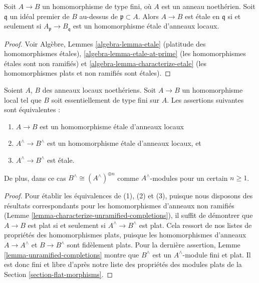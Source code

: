 \begin{lemma}
\label{lemma-characterize-etale-Noetherian}
Soit $A \to B$ un homomorphisme de type fini, où $A$ est un anneau noethérien.
Soit $\mathfrak q$ un idéal premier de $B$ au-dessus de $\mathfrak p \subset A$.
Alors $A \to B$ est \'etale en $\mathfrak q$ si et seulement si
$A_{\mathfrak p} \to B_{\mathfrak q}$ est un homomorphisme \'etale
d'anneaux locaux.
\end{lemma}

\begin{proof}
Voir Algèbre, Lemmes \ref{algebra-lemma-etale} (platitude des homomorphismes \'etales),
\ref{algebra-lemma-etale-at-prime} (les homomorphismes \'etales sont non ramifiés)
et \ref{algebra-lemma-characterize-etale} (les homomorphismes plats et non ramifiés
sont \'etales).
\end{proof}

\begin{lemma}
\label{lemma-characterize-etale-completions}
Soient $A$, $B$ des anneaux locaux noethériens.
Soit $A \to B$ un homomorphisme local tel que $B$ soit essentiellement de
type fini sur $A$.
Les assertions suivantes sont équivalentes :
\begin{enumerate}
\item $A \to B$ est un homomorphisme \'etale d'anneaux locaux
\item $A^\wedge \to B^\wedge$ est un homomorphisme \'etale d'anneaux locaux, et
\item $A^\wedge \to B^\wedge$ est \'etale.
\end{enumerate}
De plus, dans ce cas $B^\wedge \cong (A^\wedge)^{\oplus n}$ comme
$A^\wedge$-modules pour un certain $n \geq 1$.
\end{lemma}

\begin{proof}
Pour établir les équivalences de (1), (2) et (3), puisque nous disposons des résultats
correspondants pour les homomorphismes d'anneaux non ramifiés
(Lemme \ref{lemma-characterize-unramified-completions}),
il suffit de démontrer que
$A \to B$ est plat si et seulement si $A^\wedge \to B^\wedge$ est plat.
Cela ressort de nos listes de propriétés des homomorphismes plats, puisque
les homomorphismes d'anneaux $A \to A^\wedge$ et $B \to B^\wedge$ sont fidèlement plats.
Pour la dernière assertion, Lemme \ref{lemma-unramified-completions}
montre que $B^\wedge$ est un $A^\wedge$-module fini et plat.
Il est donc fini et libre d'après notre liste
des propriétés des modules plats de la Section \ref{section-flat-morphisms}.
\end{proof}

